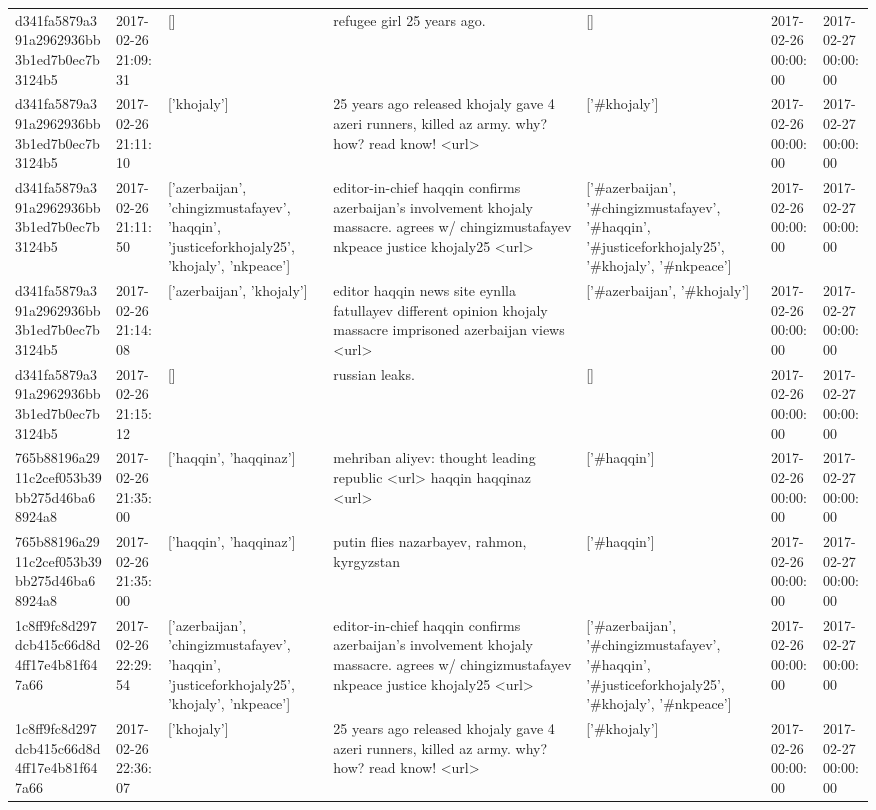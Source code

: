 \begin{tabular}{lllllll}
d341fa5879a391a2962936bb3b1ed7b0ec7b3124b5 & 2017-02-26 21:09:31 & [] & refugee girl 25 years ago. & [] & 2017-02-26 00:00:00 & 2017-02-27 00:00:00 \\
d341fa5879a391a2962936bb3b1ed7b0ec7b3124b5 & 2017-02-26 21:11:10 & ['khojaly'] & 25 years ago released khojaly gave 4 azeri runners, killed az army. why? how? read know! <url> & ['#khojaly'] & 2017-02-26 00:00:00 & 2017-02-27 00:00:00 \\
d341fa5879a391a2962936bb3b1ed7b0ec7b3124b5 & 2017-02-26 21:11:50 & ['azerbaijan', 'chingizmustafayev', 'haqqin', 'justiceforkhojaly25', 'khojaly', 'nkpeace'] & editor-in-chief haqqin confirms azerbaijan's involvement khojaly massacre. agrees w/ chingizmustafayev nkpeace justice khojaly25 <url> & ['#azerbaijan', '#chingizmustafayev', '#haqqin', '#justiceforkhojaly25', '#khojaly', '#nkpeace'] & 2017-02-26 00:00:00 & 2017-02-27 00:00:00 \\
d341fa5879a391a2962936bb3b1ed7b0ec7b3124b5 & 2017-02-26 21:14:08 & ['azerbaijan', 'khojaly'] & editor haqqin news site eynlla fatullayev different opinion khojaly massacre imprisoned azerbaijan views <url> & ['#azerbaijan', '#khojaly'] & 2017-02-26 00:00:00 & 2017-02-27 00:00:00 \\
d341fa5879a391a2962936bb3b1ed7b0ec7b3124b5 & 2017-02-26 21:15:12 & [] & russian leaks. & [] & 2017-02-26 00:00:00 & 2017-02-27 00:00:00 \\
765b88196a2911c2cef053b39bb275d46ba68924a8 & 2017-02-26 21:35:00 & ['haqqin', 'haqqinaz'] & mehriban aliyev: thought leading republic <url> haqqin haqqinaz <url> & ['#haqqin'] & 2017-02-26 00:00:00 & 2017-02-27 00:00:00 \\
765b88196a2911c2cef053b39bb275d46ba68924a8 & 2017-02-26 21:35:00 & ['haqqin', 'haqqinaz'] & putin flies nazarbayev, rahmon, kyrgyzstan & ['#haqqin'] & 2017-02-26 00:00:00 & 2017-02-27 00:00:00 \\
1c8ff9fc8d297dcb415c66d8d4ff17e4b81f647a66 & 2017-02-26 22:29:54 & ['azerbaijan', 'chingizmustafayev', 'haqqin', 'justiceforkhojaly25', 'khojaly', 'nkpeace'] & editor-in-chief haqqin confirms azerbaijan's involvement khojaly massacre. agrees w/ chingizmustafayev nkpeace justice khojaly25 <url> & ['#azerbaijan', '#chingizmustafayev', '#haqqin', '#justiceforkhojaly25', '#khojaly', '#nkpeace'] & 2017-02-26 00:00:00 & 2017-02-27 00:00:00 \\
1c8ff9fc8d297dcb415c66d8d4ff17e4b81f647a66 & 2017-02-26 22:36:07 & ['khojaly'] & 25 years ago released khojaly gave 4 azeri runners, killed az army. why? how? read know! <url> & ['#khojaly'] & 2017-02-26 00:00:00 & 2017-02-27 00:00:00 \\

\end{tabular}
